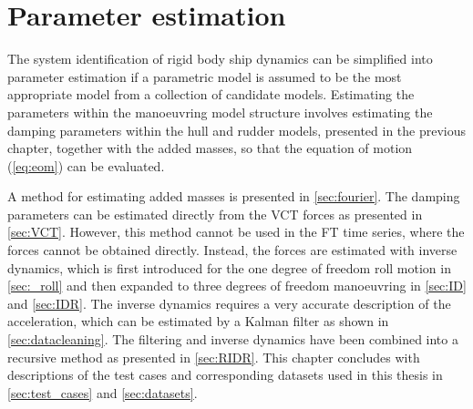 \chapter{Parameter estimation}\label{ch:methods}
\noindent The system identification of rigid body ship dynamics can be simplified into parameter estimation if a parametric model is assumed to be the most appropriate model from a collection of candidate models. Estimating the parameters within the manoeuvring model structure involves estimating the damping parameters within the hull and rudder models, presented in the previous chapter, together with the added masses, so that the equation of motion (\autoref{eq:eom}) can be evaluated.

A method for estimating added masses is presented in \autoref{sec:fourier}. The damping parameters can be estimated directly from the VCT forces as presented in \autoref{sec:VCT}. However, this method cannot be used in the FT time series, where the forces cannot be obtained directly. Instead, the forces are estimated with inverse dynamics, which is first introduced for the one degree of freedom roll motion in \autoref{sec:_roll} and then expanded to three degrees of freedom manoeuvring in \autoref{sec:ID} and \autoref{sec:IDR}. The inverse dynamics requires a very accurate description of the acceleration, which can be estimated by a Kalman filter as shown in \autoref{sec:datacleaning}. The filtering and inverse dynamics have been combined into a recursive method as presented in \autoref{sec:RIDR}. This chapter concludes with descriptions of the test cases and corresponding datasets used in this thesis in \autoref{sec:test_cases} and \ref{sec:datasets}.

%
%
%
%

